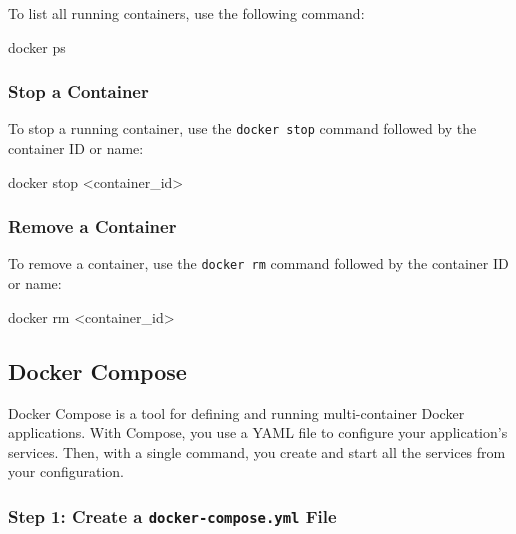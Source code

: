 \documentclass[
  letterpaper,
  DIV=11,
  numbers=noendperiod]{scrreprt}
\newenvironment{Shaded}{\begin{snugshade}}{\end{snugshade}}
\newcommand{\ExtensionTok}[1]{\textcolor[rgb]{0.00,0.23,0.31}{#1}}
\newcommand{\NormalTok}[1]{\textcolor[rgb]{0.00,0.23,0.31}{#1}}
\newcommand{\OperatorTok}[1]{\textcolor[rgb]{0.37,0.37,0.37}{#1}}
\begin{document}
To list all running containers, use the following command:

\begin{Shaded}
\begin{Highlighting}[]
\ExtensionTok{docker}\NormalTok{ ps}
\end{Highlighting}
\end{Shaded}

\subsubsection{Stop a Container}\label{stop-a-container}

To stop a running container, use the \texttt{docker\ stop} command
followed by the container ID or name:

\begin{Shaded}
\begin{Highlighting}[]
\ExtensionTok{docker}\NormalTok{ stop }\OperatorTok{\textless{}}\NormalTok{container\_id}\OperatorTok{\textgreater{}}
\end{Highlighting}
\end{Shaded}

\subsubsection{Remove a Container}\label{remove-a-container}

To remove a container, use the \texttt{docker\ rm} command followed by
the container ID or name:

\begin{Shaded}
\begin{Highlighting}[]
\ExtensionTok{docker}\NormalTok{ rm }\OperatorTok{\textless{}}\NormalTok{container\_id}\OperatorTok{\textgreater{}}
\end{Highlighting}
\end{Shaded}

\subsection{Docker Compose}\label{docker-compose}

Docker Compose is a tool for defining and running multi-container Docker
applications. With Compose, you use a YAML file to configure your
application's services. Then, with a single command, you create and
start all the services from your configuration.

\subsubsection{\texorpdfstring{Step 1: Create a
\texttt{docker-compose.yml}
File}{Step 1: Create a docker-compose.yml File}}\label{step-1-create-a-docker-compose.yml-file}
\end{document}
